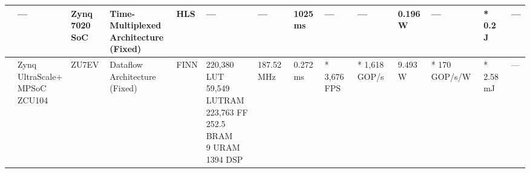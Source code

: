 \begin{center}
{\begin{tabular}{llllllllllllll}
\cite{kimOnOrbitAICloud2024} & --- & \makecell[tl]{Zynq\\ 7020 SoC} & \makecell[tl]{Time-Multiplexed\\ Architecture\\ (Fixed)} & HLS & --- & --- & 1025 ms & --- & --- & 0.196 W & --- & * 0.2 J & --- \\ \hline
\cite{liFPGABasedLowBitLightweight2025} & \makecell[tl]{Zynq\\ UltraScale+\\ MPSoC\\ ZCU104} & ZU7EV & \makecell[tl]{Dataflow\\ Architecture\\ (Fixed)} & FINN & \makecell[tl]{220,380 LUT\\ 59,549 LUTRAM\\ 223,763 FF\\ 252.5 BRAM\\ 9 URAM\\ 1394 DSP} & 187.52 MHz & 0.272 ms & * 3,676 FPS & * 1,618 GOP/s & 9.493 W & * 170 GOP/s/W & * 2.58 mJ & --- \\
\bottomrule
\end{tabular}}
\end{center}
